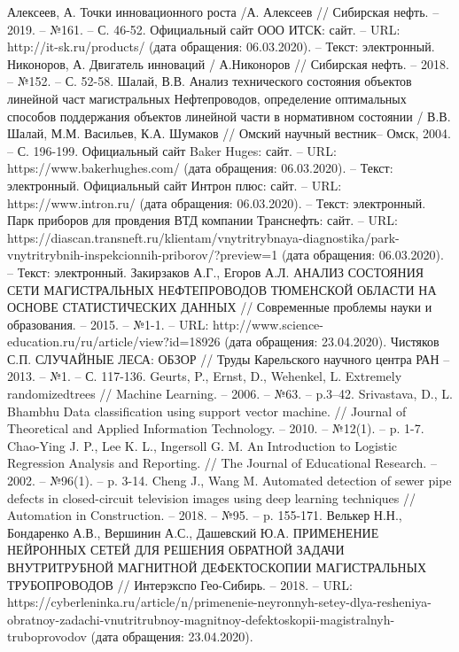 \documentclass[a4paper,article,14pt]{extarticle}
\begin{document}
\begin{thebibliography}{1}
 Алексеев, А. Точки инновационного роста /А. Алексеев // \flqq Сибирская нефть\frqq. – 2019. – №161. – С. 46-52.
 Официальный сайт ООО \flqq ИТСК\frqq: сайт. – URL: http://it-sk.ru/products/ (дата обращения: 06.03.2020). – Текст: электронный.
 Никоноров, А. Двигатель инноваций / А.Никоноров // \flqq Сибирская нефть\frqq. – 2018. – №152. – С. 52-58.
 Шалай, В.В. Анализ технического состояния объектов линейной част магистральных Нефтепроводов, определение оптимальных способов поддержания объектов линейной части в нормативном состоянии / В.В. Шалай, М.М. Васильев, К.А. Шумаков // \flqq Омский научный вестник\frqq – Омск, 2004. – С. 196-199.
 Официальный сайт \flqq Baker Huges\frqq: сайт. – URL: https://www.bakerhughes.com/ (дата обращения: 06.03.2020). – Текст: электронный.
 Официальный сайт \flqq Интрон плюс\frqq: сайт. – URL: https://www.intron.ru/ (дата обращения: 06.03.2020). – Текст: электронный.
 Парк приборов для провдения ВТД компании \flqq Транснефть\frqq: сайт. – URL: https://diascan.transneft.ru/klientam/vnytritrybnaya-diagnostika/park-vnytritrybnih-inspekcionnih-priborov/?preview=1 (дата обращения: 06.03.2020). – Текст: электронный.
 Закирзаков А.Г., Егоров А.Л. АНАЛИЗ СОСТОЯНИЯ СЕТИ МАГИСТРАЛЬНЫХ НЕФТЕПРОВОДОВ ТЮМЕНСКОЙ ОБЛАСТИ НА ОСНОВЕ СТАТИСТИЧЕСКИХ ДАННЫХ // Современные проблемы науки и образования. – 2015. – №1-1. – URL: http://www.science-education.ru/ru/article/view?id=18926 (дата обращения: 23.04.2020).
 Чистяков С.П. СЛУЧАЙНЫЕ ЛЕСА: ОБЗОР // Труды Карельского научного центра РАН – 2013. – №1. – С. 117-136.
 Geurts, P., Ernst, D., Wehenkel, L. Extremely randomizedtrees // Machine Learning. – 2006. – №63. –  p.3–42.
 Srivastava, D., L. Bhambhu Data classification  using  support  vector  machine. // Journal of Theoretical and Applied Information Technology. – 2010. – №12(1). – p. 1-7.
 Chao-Ying J. P., Lee K. L., Ingersoll G. M. An Introduction to Logistic Regression Analysis and Reporting. // The Journal of Educational Research. – 2002. – №96(1). – p. 3-14.
 Cheng J., Wang M. Automated detection of sewer pipe defects in closed-circuit television images using deep learning techniques // Automation in Construction. – 2018. – №95. – p. 155-171.
 Велькер Н.Н., Бондаренко А.В., Вершинин А.С., Дашевский Ю.А. ПРИМЕНЕНИЕ НЕЙРОННЫХ СЕТЕЙ ДЛЯ РЕШЕНИЯ ОБРАТНОЙ ЗАДАЧИ ВНУТРИТРУБНОЙ МАГНИТНОЙ ДЕФЕКТОСКОПИИ МАГИСТРАЛЬНЫХ ТРУБОПРОВОДОВ // Интерэкспо Гео-Сибирь. – 2018. – URL: https://cyberleninka.ru/article/n/primenenie-neyronnyh-setey-dlya-resheniya-obratnoy-zadachi-vnutritrubnoy-magnitnoy-defektoskopii-magistralnyh-truboprovodov (дата обращения: 23.04.2020).

\end{thebibliography}
\end{document}
